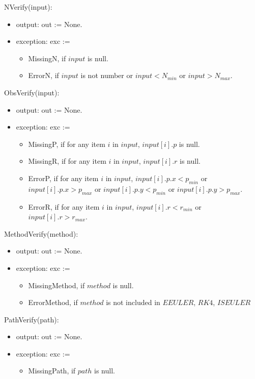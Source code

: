 \documentclass[12pt, titlepage]{article}
\begin{document}
\noindent NVerify(input):
\begin{itemize}
\item output: out := None. 
\item exception: exc :=
\begin{itemize}
  \item MissingN, if $input$ is null.
  \item ErrorN, if $input$ is not number or $input < N_{min}$ or $input > N_{max}$.
\end{itemize}
\end{itemize}

\noindent ObsVerify(input):
\begin{itemize}
\item output: out := None. 
\item exception: exc :=
\begin{itemize}
  \item MissingP, if for any item $i$ in $input$, $input[i].p$ is null.
  \item MissingR, if for any item $i$ in $input$, $input[i].r$ is null.
  \item ErrorP, if for any item $i$ in $input$, $input[i].p.x < p_{min}$ 
  or $input[i].p.x > p_{max}$ or $input[i].p.y < p_{min}$ 
  or $input[i].p.y > p_{max}$.
  \item ErrorR, if for any item $i$ in $input$, $input[i].r < r_{min}$ 
  or $input[i].r > r_{max}$.
\end{itemize}
\end{itemize}

\noindent MethodVerify(method):
\begin{itemize}
\item output: out := None. 
\item exception: exc :=
\begin{itemize}
  \item MissingMethod, if $method$ is null.
  \item ErrorMethod, if $method$ is not included in {$EEULER$, $RK4$, $ISEULER$}
\end{itemize}
\end{itemize}

\noindent PathVerify(path):
\begin{itemize}
\item output: out := None. 
\item exception: exc :=
\begin{itemize}
  \item MissingPath, if $path$ is null.
\end{itemize}
\end{itemize}
\end{document}
